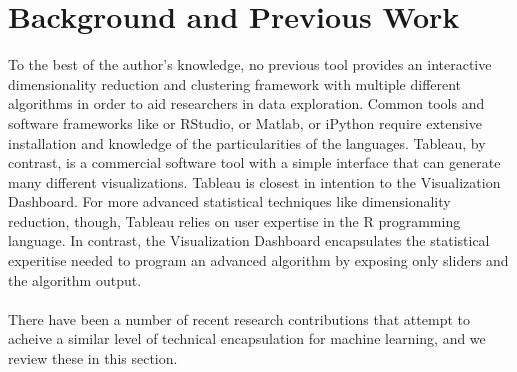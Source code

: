 \documentclass{sigchi}
\begin{document}
\section{Background and Previous Work}%
%
To the best of the author's knowledge, no previous tool provides an interactive dimensionality reduction and clustering framework with multiple different algorithms in order to aid researchers in data exploration. %
%
Common tools and software frameworks like or RStudio, or Matlab, or iPython require extensive installation and knowledge of the particularities of the languages. %
Tableau, by contrast, is a commercial software tool with a simple interface that can generate many different visualizations. %
%
Tableau is closest in intention to the Visualization Dashboard. %
For more advanced statistical techniques like dimensionality reduction, though, Tableau relies on user expertise in the R programming language. %
In contrast, the Visualization Dashboard encapsulates the statistical experitise needed to program an advanced algorithm by exposing only sliders and the algorithm output. %
%
\\\\
%
There have been a number of recent research contributions that attempt to acheive a similar level of technical encapsulation for machine learning, and we review these in this section. %
\end{document}
